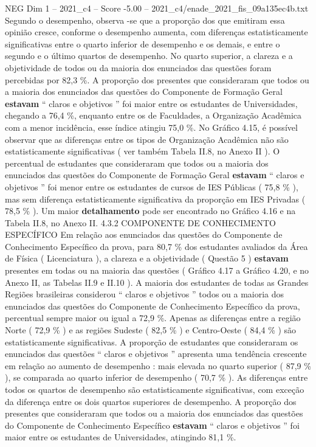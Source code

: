 \begin{textsample}{NEG Dim 1 – 2021\_c4 – Score -5.00 – 2021\_c4/enade\_2021\_fis\_09a135ec4b.txt}
Segundo o desempenho, observa -se que a proporção dos que emitiram essa opinião cresce, conforme o desempenho aumenta, com diferenças estatisticamente significativas entre o quarto inferior de desempenho e os demais, e entre o segundo e o último quartos de desempenho.
No quarto superior, a clareza e a objetividade de todos ou da maioria dos enunciados das questões foram percebidas por 82,3 \%.
A proporção dos presentes que consideraram que todos ou a maioria dos enunciados das questões do Componente de Formação Geral \textbf{estavam} “ claros e objetivos ” foi maior entre os estudantes de Universidades, chegando a 76,4 \%, enquanto entre os de Faculdades, a Organização Acadêmica com a menor incidência, esse índice atingiu 75,0 \%.
No Gráfico 4.15, é possível observar que as diferenças entre os tipos de Organização Acadêmica não são estatisticamente significativas ( ver também Tabela II.8, no Anexo II ).
O percentual de estudantes que consideraram que todos ou a maioria dos enunciados das questões do Componente de Formação Geral \textbf{estavam} “ claros e objetivos ” foi menor entre os estudantes de cursos de IES Públicas ( 75,8 \% ), mas sem diferença estatisticamente significativa da proporção em IES Privadas ( 78,5 \% ).
Um maior \textbf{detalhamento} pode ser encontrado no Gráfico 4.16 e na Tabela II.8, no Anexo II. 4.3.2 COMPONENTE DE CONHECIMENTO ESPECÍFICO Em relação aos enunciados das questões do Componente de Conhecimento Específico da prova, para 80,7 \% dos estudantes avaliados da Área de Física ( Licenciatura ), a clareza e a objetividade ( Questão 5 ) \textbf{estavam} presentes em todas ou na maioria das questões ( Gráfico 4.17 a Gráfico 4.20, e no Anexo II, as Tabelas II.9 e II.10 ).
A maioria dos estudantes de todas as Grandes Regiões brasileiras considerou “ claros e objetivos ” todos ou a maioria dos enunciados das questões do Componente de Conhecimento Específico da prova, percentual sempre maior ou igual a 72,9 \%.
Apenas as diferenças entre a região Norte ( 72,9 \% ) e as regiões Sudeste ( 82,5 \% ) e Centro-Oeste ( 84,4 \% ) são estatisticamente significativas.
A proporção de estudantes que consideraram os enunciados das questões “ claros e objetivos ” apresenta uma tendência crescente em relação ao aumento de desempenho : mais elevada no quarto superior ( 87,9 \% ), se comparada ao quarto inferior de desempenho ( 70,7 \% ).
As diferenças entre todos os quartos de desempenho são estatisticamente significativas, com exceção da diferença entre os dois quartos superiores de desempenho.
A proporção dos presentes que consideraram que todos ou a maioria dos enunciados das questões do Componente de Conhecimento Específico \textbf{estavam} “ claros e objetivos ” foi maior entre os estudantes de Universidades, atingindo 81,1 \%.

\end{textsample}

